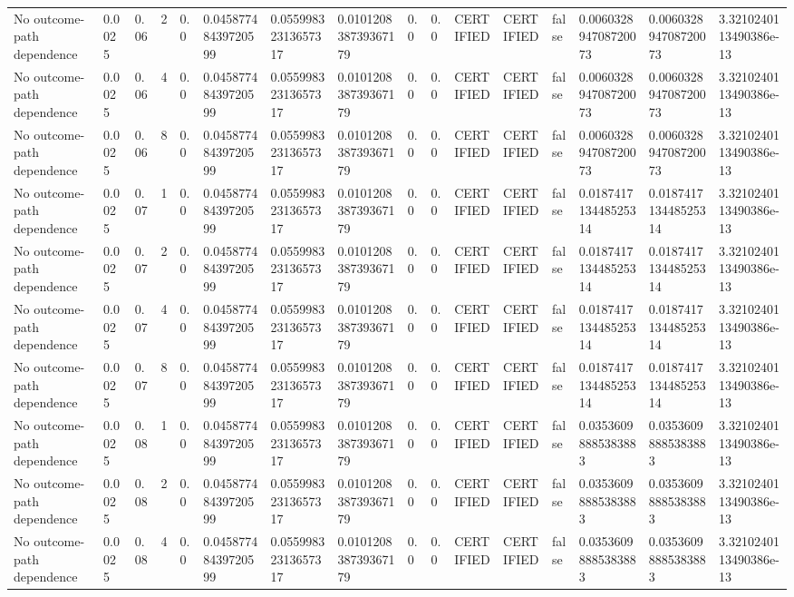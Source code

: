 \begin{tabular}{llllllllllllllll}
No outcome-path dependence & 0.0025 & 0.06 & 2 & 0.0 & 0.04587748439720599 & 0.05599832313657317 & 0.010120838739367179 & 0.0 & 0.0 & CERTIFIED & CERTIFIED & false & 0.006032894708720073 & 0.006032894708720073 & 3.3210240113490386e-13 \\
No outcome-path dependence & 0.0025 & 0.06 & 4 & 0.0 & 0.04587748439720599 & 0.05599832313657317 & 0.010120838739367179 & 0.0 & 0.0 & CERTIFIED & CERTIFIED & false & 0.006032894708720073 & 0.006032894708720073 & 3.3210240113490386e-13 \\
No outcome-path dependence & 0.0025 & 0.06 & 8 & 0.0 & 0.04587748439720599 & 0.05599832313657317 & 0.010120838739367179 & 0.0 & 0.0 & CERTIFIED & CERTIFIED & false & 0.006032894708720073 & 0.006032894708720073 & 3.3210240113490386e-13 \\
No outcome-path dependence & 0.0025 & 0.07 & 1 & 0.0 & 0.04587748439720599 & 0.05599832313657317 & 0.010120838739367179 & 0.0 & 0.0 & CERTIFIED & CERTIFIED & false & 0.018741713448525314 & 0.018741713448525314 & 3.3210240113490386e-13 \\
No outcome-path dependence & 0.0025 & 0.07 & 2 & 0.0 & 0.04587748439720599 & 0.05599832313657317 & 0.010120838739367179 & 0.0 & 0.0 & CERTIFIED & CERTIFIED & false & 0.018741713448525314 & 0.018741713448525314 & 3.3210240113490386e-13 \\
No outcome-path dependence & 0.0025 & 0.07 & 4 & 0.0 & 0.04587748439720599 & 0.05599832313657317 & 0.010120838739367179 & 0.0 & 0.0 & CERTIFIED & CERTIFIED & false & 0.018741713448525314 & 0.018741713448525314 & 3.3210240113490386e-13 \\
No outcome-path dependence & 0.0025 & 0.07 & 8 & 0.0 & 0.04587748439720599 & 0.05599832313657317 & 0.010120838739367179 & 0.0 & 0.0 & CERTIFIED & CERTIFIED & false & 0.018741713448525314 & 0.018741713448525314 & 3.3210240113490386e-13 \\
No outcome-path dependence & 0.0025 & 0.08 & 1 & 0.0 & 0.04587748439720599 & 0.05599832313657317 & 0.010120838739367179 & 0.0 & 0.0 & CERTIFIED & CERTIFIED & false & 0.03536098885383883 & 0.03536098885383883 & 3.3210240113490386e-13 \\
No outcome-path dependence & 0.0025 & 0.08 & 2 & 0.0 & 0.04587748439720599 & 0.05599832313657317 & 0.010120838739367179 & 0.0 & 0.0 & CERTIFIED & CERTIFIED & false & 0.03536098885383883 & 0.03536098885383883 & 3.3210240113490386e-13 \\
No outcome-path dependence & 0.0025 & 0.08 & 4 & 0.0 & 0.04587748439720599 & 0.05599832313657317 & 0.010120838739367179 & 0.0 & 0.0 & CERTIFIED & CERTIFIED & false & 0.03536098885383883 & 0.03536098885383883 & 3.3210240113490386e-13 \\

\end{tabular}
